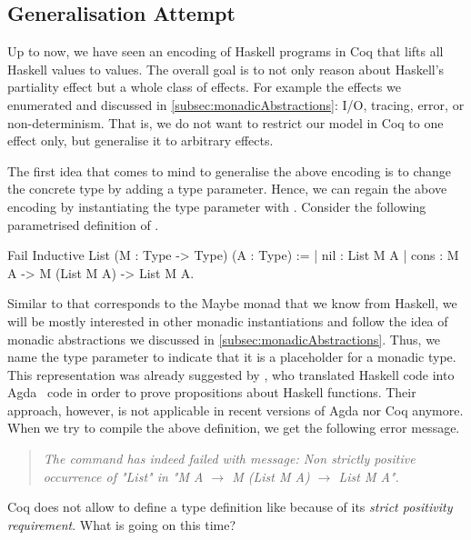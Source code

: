 \subsection{Generalisation Attempt}
\label{subsec:genericLifting}

Up to now, we have seen an encoding of Haskell programs in Coq that lifts all Haskell values to  values.
The overall goal is to not only reason about Haskell's partiality effect but a whole class of effects.
For example the effects we enumerated and discussed in \autoref{subsec:monadicAbstractions}: I/O, tracing, error, or non\--determinism.
That is, we do not want to restrict our model in Coq to one effect only, but generalise it to arbitrary effects.

The first idea that comes to mind to generalise the above encoding is to change the concrete type  by adding a type parameter.
Hence, we can regain the above encoding by instantiating the type parameter with .
Consider the following parametrised definition of .

\begin{coqcode}
Fail Inductive List (M : Type -> Type) (A : Type) :=
| nil : List M A
| cons : M A -> M (List M A) -> List M A.
\end{coqcode}

Similar to  that corresponds to the Maybe monad that we know from Haskell, we will be mostly interested in other monadic instantiations and follow the idea of monadic abstractions we discussed in \autoref{subsec:monadicAbstractions}.
Thus, we name the type parameter  to indicate that it is a placeholder for a monadic type.
This representation was already suggested by \citet{abel2005verifying}, who translated Haskell code into Agda~\citep{norell2009dependently} code in order to prove propositions about Haskell functions.
Their approach, however, is not applicable in recent versions of Agda nor Coq anymore.
When we try to compile the above definition, we get the following error message.

\begin{quote}
\emph{The command has indeed failed with message:
Non strictly positive occurrence of "List" in "M A $\rightarrow$ M (List M A) $\rightarrow$ List M A".}
\end{quote}

Coq does not allow to define a type definition like  because of its \emph{strict positivity requirement}.
What is going on this time?

